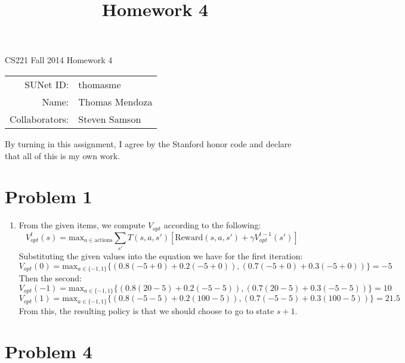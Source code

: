 \documentclass[12pt]{article}
\title{Homework 4}
\begin{document}
\begin{center}
{\Large CS221 Fall 2014 Homework 4}

\begin{tabular}{rl}
SUNet ID: & thomasme \\
Name: & Thomas Mendoza \\
Collaborators: & Steven Samson
\end{tabular}
\end{center}

By turning in this assignment, I agree by the Stanford honor code and declare
that all of this is my own work.

\section*{Problem 1}

\begin{enumerate}[label=(\alph*)]
	\item From the given items, we compute \(V_{opt}\) according to the following:
		\[
			V_{opt}^{t}(s) = \text{max}_{a \in \text{actions}} \sum_{s'} T(s,a,s')
			\left[ \text{Reward}(s,a,s') + \gamma V_{opt}^{t-1}(s') \right]
		\]
		Substituting the given values into the equation we have for the first
		iteration:
		\[
			V_{opt}(0) = \text{max}_{a \in \{-1, 1\}}
				\{(0.8(-5 + 0) + 0.2(-5 + 0)),
				(0.7(-5 + 0) + 0.3(-5 + 0))\}
				= -5
		\]
		Then the second:
		\[
			V_{opt}(-1) = \text{max}_{a \in \{-1, 1\}}
				\{(0.8(20 - 5) + 0.2(-5 - 5)),
				(0.7(20 - 5) + 0.3(-5 - 5))\}
				= 10
		\]
		\[
			V_{opt}(1) = \text{max}_{a \in \{-1, 1\}}
				\{(0.8(-5 - 5) + 0.2(100 - 5)),
				(0.7(-5 - 5) + 0.3(100 - 5))\}
				= 21.5
		\]
		From this, the resulting policy is that we should choose to go to state \(s+1\).

\end{enumerate}

\section*{Problem 4}
\end{document}
